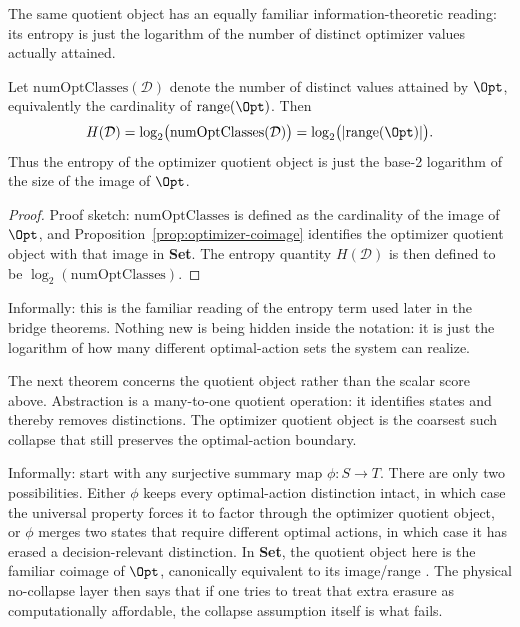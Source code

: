 The same quotient object has an equally familiar information-theoretic reading: its entropy is just the logarithm of the number of distinct optimizer values actually attained.

\begin{proposition}\label{prop:optimizer-entropy-image}
Let $\mathrm{numOptClasses}(\mathcal{D})$ denote the number of distinct values attained by $\Opt$, equivalently the cardinality of $\mathrm{range}(\Opt)$. Then
\[
H(\mathcal{D}) = \log_2\bigl(\mathrm{numOptClasses}(\mathcal{D})\bigr)
=
\log_2\bigl(|\mathrm{range}(\Opt)|\bigr).
\]
Thus the entropy of the optimizer quotient object is just the base-2 logarithm of the size of the image of $\Opt$.
\end{proposition}

\begin{proof}
Proof sketch: $\mathrm{numOptClasses}$ is defined as the cardinality of the image of $\Opt$, and Proposition~\ref{prop:optimizer-coimage} identifies the optimizer quotient object with that image in \textbf{Set}. The entropy quantity $H(\mathcal{D})$ is then defined to be $\log_2(\mathrm{numOptClasses})$.
\end{proof}

Informally: this is the familiar reading of the entropy term used later in the bridge theorems. Nothing new is being hidden inside the notation: it is just the logarithm of how many different optimal-action sets the system can realize.

The next theorem concerns the quotient object rather than the scalar score above. Abstraction is a many-to-one quotient operation: it identifies states and thereby removes distinctions. The optimizer quotient object is the coarsest such collapse that still preserves the optimal-action boundary.

Informally: start with any surjective summary map $\phi : S \to T$. There are only two possibilities. Either $\phi$ keeps every optimal-action distinction intact, in which case the universal property forces it to factor through the optimizer quotient object, or $\phi$ merges two states that require different optimal actions, in which case it has erased a decision-relevant distinction. In \textbf{Set}, the quotient object here is the familiar coimage of $\Opt$, canonically equivalent to its image/range \cite{maclane1998categories}. The physical no-collapse layer then says that if one tries to treat that extra erasure as computationally affordable, the collapse assumption itself is what fails.

